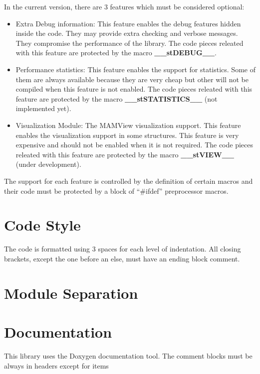 In the current version, there are 3 features which must be considered optional:

\begin{itemize}
	\item Extra Debug information: This feature enables the debug features hidden inside the code.
		They may provide extra checking and verbose messages. They compromise the performance of
		the library. The code pieces releated with this feature are protected by the macro
		{\bf \_\_stDEBUG\_\_}.
	\item Performance statistics: This feature enables the support for statistics. Some of them
		are always available because they are very cheap but other will not be compiled when this
		feature is not enabled. The code pieces releated with this feature are protected by the
		macro {\bf \_\_stSTATISTICS\_\_} (not implemented yet).
	\item Visualization Module: The MAMView visualization support. This feature enables the
		visualization support in some structures. This feature is very expensive and should not be
		enabled when it is not required. The code pieces releated with this feature are protected
		by the macro {\bf \_\_stVIEW\_\_} (under development).
\end{itemize}

The support for each feature is controlled by the definition of certain macros and their
code must be protected by a block of ``\#ifdef'' preprocessor macros.

\section{Code Style}

The code is formatted using 3 spaces for each level of indentation. All closing brackets,
except the one before an else, must have an ending block comment.

\section{Module Separation}


\section{Documentation}

This library uses the Doxygen documentation tool. The comment blocks must be always in headers
except for items


